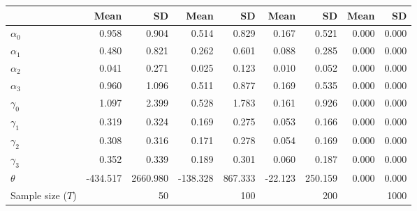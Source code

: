 
\begin{tabular}[t]{lrrrrrrrr}
\toprule
  & Mean & SD & Mean  & SD  & Mean   & SD   & Mean    & SD   \\
\midrule
$\alpha_{0}$ & 0.958 & 0.904 & 0.514 & 0.829 & 0.167 & 0.521 & 0.000 & 0.000\\
$\alpha_{1}$ & 0.480 & 0.821 & 0.262 & 0.601 & 0.088 & 0.285 & 0.000 & 0.000\\
$\alpha_{2}$ & 0.041 & 0.271 & 0.025 & 0.123 & 0.010 & 0.052 & 0.000 & 0.000\\
$\alpha_{3}$ & 0.960 & 1.096 & 0.511 & 0.877 & 0.169 & 0.535 & 0.000 & 0.000\\
$\gamma_{0}$ & 1.097 & 2.399 & 0.528 & 1.783 & 0.161 & 0.926 & 0.000 & 0.000\\
$\gamma_{1}$ & 0.319 & 0.324 & 0.169 & 0.275 & 0.053 & 0.166 & 0.000 & 0.000\\
$\gamma_{2}$ & 0.308 & 0.316 & 0.171 & 0.278 & 0.054 & 0.169 & 0.000 & 0.000\\
$\gamma_{3}$ & 0.352 & 0.339 & 0.189 & 0.301 & 0.060 & 0.187 & 0.000 & 0.000\\
$\theta$ & -434.517 & 2660.980 & -138.328 & 867.333 & -22.123 & 250.159 & 0.000 & 0.000\\
Sample size ($T$) &  & 50 &  & 100 &  & 200 &  & 1000\\
\bottomrule
\end{tabular}
